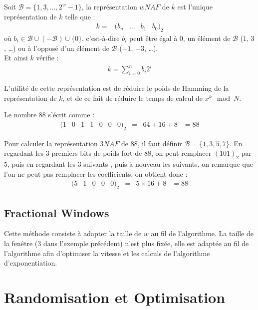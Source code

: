 \documentclass[12pt, a4paper]{memoir}
\begin{document}
Soit $\mathcal{B} = \{1,3,\ldots,2^w - 1\}$, la représentation $wNAF$ de $k$ est l'unique représentation 
de $k$ telle que : 
$$\begin{array}{lcccc}
k = & (b_n & \ldots & b_1 & b_0)_2
\end{array}$$ où $b_i \in \mathcal{B} \cup (-\mathcal{B}) \cup \{0\}$, c'est-à-dire $b_i$ peut être égal à 
$0$, un élément de $\mathcal{B}$ ($1$, $3$ , \ldots) ou à l'opposé d'un élément de $\mathcal{B}$ ($-1$, $-3$, \ldots). \\
Et ainsi $k$ vérifie :
\begin{eqnarray*}
 k = \sum_{i=0}^{n} b_i 2^i
\end{eqnarray*}

L'utilité de cette représentation est de réduire le poids de Hamming de la représentation de $k$, 
et de ce fait de réduire le temps de calcul de $x^k \mod N$.

\begin{Exemple}
 Le nombre $88$ s'écrit comme :
  $$\begin{array}{cccccccccc}
  (1 & 0 & 1 & 1 & 0 & 0 & 0)_2 & = & 64 + 16 + 8 & = 88 
 \end{array}$$
 
 Pour calculer la représentation $3NAF$ de $88$, il faut définir $\mathcal{B} = \{1,3,5,7\}$.
 En regardant les $3$ premiers bits de poids fort de $88$, on peut remplacer $(101)_2$ par $5$, 
 puis en regardant les $3$ suivants , puis à nouveau les suivants, on remarque que l'on ne peut pas remplacer 
 les coefficients, on obtient donc :
  $$\begin{array}{cccccccc}
  (5 & 1 & 0 & 0 & 0)_2 & = & 5 \times 16 + 8 & = 88 
 \end{array}$$
\end{Exemple}

\subsection{Fractional Windows}

Cette méthode consiste à adapter la taille de $w$ au fil de l'algorithme.
La taille de la fenêtre ($3$ dans l'exemple précédent) n'est plus fixée, elle est adaptée au fil de l'algorithme
afin d'optimiser la vitesse et les calculs de l'algorithme d'exponentiation.


\section{Randomisation et Optimisation}
\end{document}
